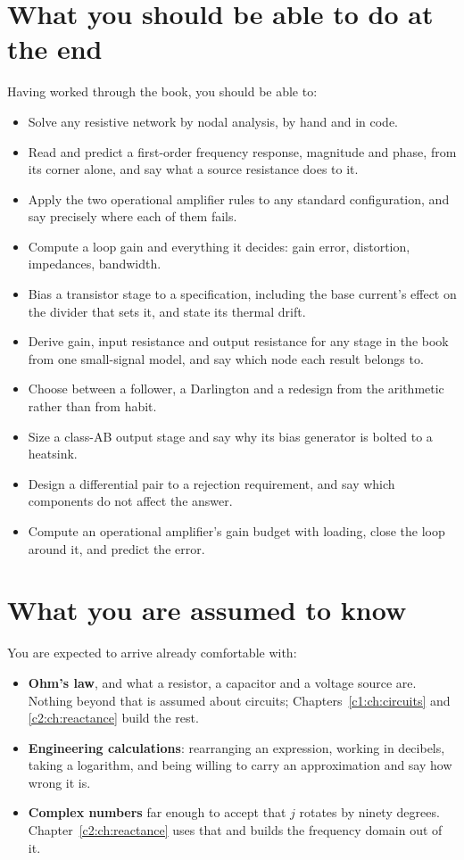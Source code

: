 \section*{What you should be able to do at the end}
Having worked through the book, you should be able to:
\begin{itemize}
  \item Solve any resistive network by nodal analysis, by hand and in code.
  \item Read and predict a first-order frequency response, magnitude and phase, from its corner
    alone, and say what a source resistance does to it.
  \item Apply the two operational amplifier rules to any standard configuration, and say precisely
    where each of them fails.
  \item Compute a loop gain and everything it decides: gain error, distortion, impedances,
    bandwidth.
  \item Bias a transistor stage to a specification, including the base current's effect on the
    divider that sets it, and state its thermal drift.
  \item Derive gain, input resistance and output resistance for any stage in the book from one
    small-signal model, and say which node each result belongs to.
  \item Choose between a follower, a Darlington and a redesign from the arithmetic rather than
    from habit.
  \item Size a class-AB output stage and say why its bias generator is bolted to a heatsink.
  \item Design a differential pair to a rejection requirement, and say which components do not
    affect the answer.
  \item Compute an operational amplifier's gain budget with loading, close the loop around it, and
    predict the error.
\end{itemize}

\section*{What you are assumed to know}
\label{pre:sec:prerequisites}
You are expected to arrive already comfortable with:
\begin{itemize}
  \item \textbf{Ohm's law}, and what a resistor, a capacitor and a voltage source are. Nothing
    beyond that is assumed about circuits; Chapters~\ref{c1:ch:circuits} and \ref{c2:ch:reactance}
    build the rest.
  \item \textbf{Engineering calculations}: rearranging an expression, working in decibels, taking
    a logarithm, and being willing to carry an approximation and say how wrong it is.
  \item \textbf{Complex numbers} far enough to accept that $j$ rotates by ninety degrees.
    Chapter~\ref{c2:ch:reactance} uses that and builds the frequency domain out of it.
\end{itemize}

